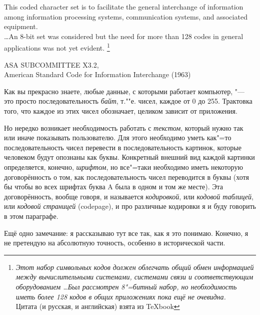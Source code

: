 
\epigraph{This coded character set is to facilitate
the general interchange of information
among information processing systems,
communication systems, and
associated equipment.\\
\dots An 8-bit set was considered
but the need for more than 128 codes
in general applications was not yet evident.
\footnote{\textit{Этот набор символьных кодов должен облегчать общий обмен информацией 
между вычислительными системами, системами связи и соответствующим 
оборудованием
\dots Был рассмотрен 8"=битный набор, но необходимость иметь более 128 кодов в 
общих приложениях пока ещё не очевидна.}\\
Цитата (и русская, и английская) взята из \TeX book}
}
{ASA SUBCOMMITTEE X3.2,\\
American Standard Code for Information Interchange (1963)\\
}

Как вы прекрасно знаете, любые данные, с которыми работает компьютер, "--- это 
просто последовательность \textit{байт}, т.""е. чисел, каждое от 0 до 255. 
Трактовка того, что каждое из этих чисел обозначает, целиком зависит от 
приложения.

Но нередко возникает необходимость работать с \textit{текстом}, который нужно так или 
иначе показывать пользователю. Для этого необходимо уметь как"=то 
последовательность чисел перевести в последовательность картинок, которые 
человеком будут опознаны как буквы. Конкретный внешний вид каждой картинки 
определяется, конечно, \textit{шрифтом}, но все"=таки необходимо иметь 
некоторую договорённость о том, как последовательность чисел переводится в 
буквы (хотя бы чтобы во всех шрифтах буква A была в одном и том же месте).      
Эта договорённость, вообще говоря, и называется \textit{кодировкой}, или \textit{кодовой таблицей},
или \textit{кодовой страницей} (codepage), и про 
различные кодировки я и буду говорить в этом параграфе.


Ещё одно замечание: я рассказываю тут все так, как я это понимаю. Конечно, 
я не претендую на абсолютную точность, особенно в исторической части.

